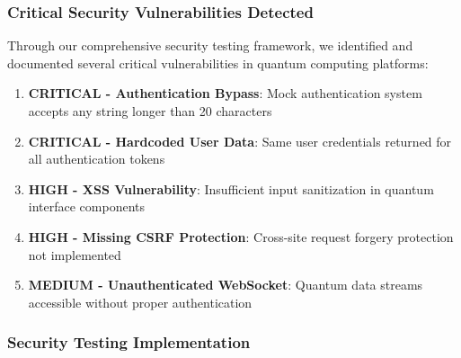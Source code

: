 \documentclass[12pt,a4paper]{report}
\begin{document}
\subsubsection{Critical Security Vulnerabilities Detected}

Through our comprehensive security testing framework, we identified and documented several critical vulnerabilities in quantum computing platforms:

\begin{enumerate}
\item \textbf{CRITICAL - Authentication Bypass}: Mock authentication system accepts any string longer than 20 characters
\item \textbf{CRITICAL - Hardcoded User Data}: Same user credentials returned for all authentication tokens
\item \textbf{HIGH - XSS Vulnerability}: Insufficient input sanitization in quantum interface components
\item \textbf{HIGH - Missing CSRF Protection}: Cross-site request forgery protection not implemented
\item \textbf{MEDIUM - Unauthenticated WebSocket}: Quantum data streams accessible without proper authentication
\end{enumerate}

\subsubsection{Security Testing Implementation}
\end{document}
